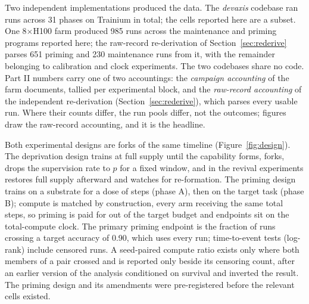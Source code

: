 \documentclass{article}
\begin{document}
Two independent implementations produced the data. The \emph{devaxis} codebase ran
\DevaxisRuns{} runs across 31 phases on Trainium in total; the cells reported here are a
subset. One 8$\times$H100 farm produced 985 runs
across the maintenance and priming programs reported here; the raw-record re-derivation of
Section~\ref{sec:rederive} parses 651 priming and 230 maintenance runs from it, with the
remainder belonging to calibration and clock experiments. The two codebases share no code.
Part II numbers carry one of two accountings: the \emph{campaign accounting} of the farm
documents, tallied per experimental block, and the \emph{raw-record accounting} of the
independent re-derivation (Section~\ref{sec:rederive}), which parses every usable run.
Where their counts differ, the run pools differ, not the outcomes; figures draw the
raw-record accounting, and it is the headline.

Both experimental designs are forks of the same timeline (Figure~\ref{fig:design}). The
deprivation design trains at full supply until the capability forms, forks, drops the
supervision rate to $p$ for a fixed window, and in the revival experiments restores full
supply afterward and watches for re-formation. The priming design trains on a substrate for a
dose of steps (phase A), then on the target task (phase B); compute is matched by
construction, every arm receiving the same total steps, so priming is paid for out of the
target budget and endpoints sit on the total-compute clock. The primary priming endpoint is
the fraction of runs crossing a target accuracy of 0.90, which uses every run; time-to-event
tests (log-rank) include censored runs. A seed-paired compute ratio exists only where both
members of a pair crossed and is reported only beside its censoring count, after an earlier
version of the analysis conditioned on survival and inverted the result. The priming design
and its amendments were pre-registered before the relevant cells existed.
\end{document}
